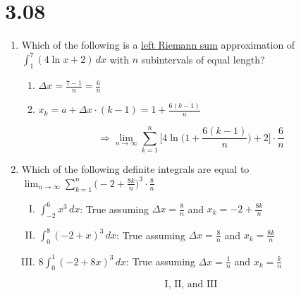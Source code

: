 \documentclass[12pt]{article}
\begin{document}
\section*{3.08}
\everymath{\displaystyle}
\begin{enumerate}
    \item Which of the following is a \underline{left Riemann sum} approximation of $\int_{1}^{7} (4\ln x+2) \, dx$ with $n$ subintervals of equal length?
    \begin{enumerate}
        \item $\Delta x = \frac{7-1}{n} = \frac{6}{n}$
        \item $x_k = a + \Delta x \cdot (k-1)  =  1 + \frac{6(k-1)}{n}$
    \end{enumerate}
   $$\Longrightarrow \boxed{ \lim_{n\to\infty} \sum_{k=1}^{n} \biggr[4\ln\bigg( 1 + \frac{6(k-1)}{n} \bigg) + 2 \biggr] \cdot \frac{6}{n}}$$
   
    \item Which of the following definite integrals are equal to $\lim_{n\to\infty} \sum_{k=1}^{n} \biggr(-2+\frac{8k}{n} \biggr)^3 \cdot \frac{8}{n}$
    \begin{enumerate}[I.]
        \item $\int_{-2}^{6} x^3 \, dx$: True assuming $\Delta x = \frac{8}{n}$ and $x_k = -2 + \frac{8k}{n}$
        \item $\int_{0}^{8} (-2+x)^3 \, dx$: True assuming $\Delta x = \frac{8}{n}$ and $x_k = \frac{8k}{n}$
        \item $8 \int_{0}^{1}(-2+8x)^3 \, dx$: True assuming $\Delta x = \frac{1}{n}$ and $x_k = \frac{k}{n}$
    \end{enumerate}
    $$\boxed{\text{I, II, and III}}$$
    

\end{enumerate}
\end{document}
